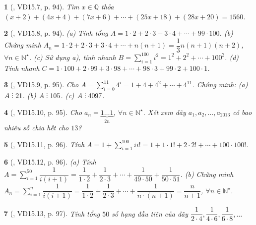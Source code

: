 \documentclass{article}
\newtheorem{baitoan}{}
\DeclareRobustCommand{\divby}{%
	\mathrel{\vbox{\baselineskip.65ex\lineskiplimit0pt\hbox{.}\hbox{.}\hbox{.}}}%
}
\begin{document}
\begin{baitoan}[\cite{TLCT_THCS_Toan_6_so_hoc}, VD15.7, p. 94]
	Tìm $x\in\mathbb{Q}$ thỏa $(x + 2) + (4x + 4) + (7x + 6) + \cdots + (25x + 18) + (28x + 20) = 1560$.
\end{baitoan}

\begin{baitoan}[\cite{TLCT_THCS_Toan_6_so_hoc}, VD15.8, p. 94]
	(a) Tính tổng $A = 1\cdot2 + 2\cdot3 + 3\cdot4 + \cdots + 99\cdot100$. (b) Chứng minh $A_n = 1\cdot2 + 2\cdot3 + 3\cdot4 + \cdots + n(n + 1) = \dfrac{1}{3}n(n + 1)(n + 2)$, $\forall n\in\mathbb{N}^\star$. (c) Sử dụng a), tính nhanh $B = \sum_{i=1}^{100} i^2 = 1^2 + 2^2 + \cdots + 100^2$. (d) Tính nhanh $C = 1\cdot100 + 2\cdot99 + 3\cdot98 + \cdots + 98\cdot3 + 99\cdot2 + 100\cdot1$.
\end{baitoan}

\begin{baitoan}[\cite{TLCT_THCS_Toan_6_so_hoc}, VD15.9, p. 95]
	Cho $A = \sum_{i=0}^{11} 4^i = 1 + 4 + 4^2 + \cdots + 4^{11}$. Chứng minh: (a) $A\divby21$. (b) $A\divby105$. (c) $A\divby4097$.
\end{baitoan}

\begin{baitoan}[\cite{TLCT_THCS_Toan_6_so_hoc}, VD15.10, p. 95]
	Cho $a_n = \underbrace{1\ldots1}_{2n}$, $\forall n\in\mathbb{N}^\star$. Xét xem dãy $a_1,a_2,\ldots,a_{2013}$ có bao nhiêu số chia hết cho $13$?
\end{baitoan}

\begin{baitoan}[\cite{TLCT_THCS_Toan_6_so_hoc}, VD15.11, p. 96]
	Tính $A = 1 + \sum_{i=1}^{100} ii!  = 1 + 1\cdot1! + 2\cdot2! + \cdots + 100\cdot100!$.
\end{baitoan}

\begin{baitoan}[\cite{TLCT_THCS_Toan_6_so_hoc}, VD15.12, p. 96]
	(a) Tính $A = \sum_{i=1}^{50} \dfrac{1}{i(i + 1)} = \dfrac{1}{1\cdot2} + \dfrac{1}{2\cdot3} + \cdots + \dfrac{1}{49\cdot50} + \dfrac{1}{50\cdot51}$. (b) Chứng minh $A_n = \sum_{i=1}^n \dfrac{1}{i(i + 1)} = \dfrac{1}{1\cdot2} + \dfrac{1}{2\cdot3} + \cdots + \dfrac{1}{n\cdot(n + 1)} = \dfrac{n}{n + 1}$, $\forall n\in\mathbb{N}^\star$.
\end{baitoan}

\begin{baitoan}[\cite{TLCT_THCS_Toan_6_so_hoc}, VD15.13, p. 97]
	Tính tổng $50$ số hạng đầu tiên của dãy $\dfrac{1}{2\cdot4},\dfrac{1}{4\cdot6},\dfrac{1}{6\cdot8},\ldots$
\end{baitoan}
\end{document}
